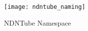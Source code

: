 \begin{figure}%
  \centering
  \texttt{[image: ndntube\_naming]}
  \caption{NDNTube Namespace}
  \label{fig:ndntube_naming}
\end{figure}

